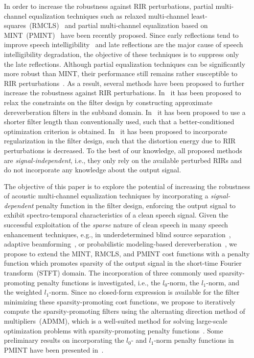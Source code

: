 \documentclass[10pt]{IEEEtran}
\begin{document}
In order to increase the robustness against RIR perturbations, partial multi-channel equalization techniques such as relaxed multi-channel least-squares~(RMCLS)~\cite{Lim_ITASLP_2014} and partial multi-channel equalization based on MINT~(PMINT)~\cite{Kodrasi_ITASLP_2013} have been recently proposed. 
Since early reflections tend to improve speech intelligibility~\cite{Arweiler_JASA_2011,Warzybok_JASA_2012} and late reflections are the major cause of speech intelligibility degradation, the objective of these techniques is to suppress only the late reflections.
Although partial equalization techniques can be significantly more robust than MINT, their performance still remains rather susceptible to RIR perturbations~\cite{Kodrasi_ITASLP_2013}.
As a result, several methods have been proposed to further increase the robustness against RIR perturbations.
In~\cite{Gaubitch_ITASLP_2009,Lim_EUSIPCO_2013} it has been proposed to relax the constraints on the filter design by constructing approximate dereverberation filters in the subband domain.
In~\cite{Kodrasi_EUSIPCO_2012} it has been proposed to use a shorter filter length than conventionally used, such that a better-conditioned optimization criterion is obtained.
In~\cite{Hikichi_EURASIP_2007,Kodrasi_ITASLP_2013} it has been proposed to incorporate regularization in the filter design, such that the distortion energy due to RIR perturbations is decreased.
To the best of our knowledge, all proposed methods are {\emph{signal-independent}}, i.e., they only rely on the available perturbed RIRs and do not incorporate any knowledge about the output signal. 

The objective of this paper is to explore the potential of increasing the robustness of acoustic multi-channel equalization techniques by incorporating a {\textit{signal-dependent}} penalty function in the filter design, enforcing the output signal to exhibit spectro-temporal characteristics of a clean speech signal. 
Given the successful exploitation of the {\textit{sparse}} nature of clean speech in many speech enhancement techniques, e.g., in underdetermined blind source separation~\cite{makino_2010,Arberet_ITASLP_2013}, adaptive beamforming~\cite{Kumatani_ITASLP_2009}, or probabilistic modeling-based dereverberation~\cite{vanwaterschoot13-122,Jukic_ITASLP_2015,Jukic_AES_2016}, we propose to extend the MINT, RMCLS, and PMINT cost functions with a penalty function which promotes sparsity of the output signal in the short-time Fourier transform~(STFT) domain.
The incorporation of three commonly used sparsity-promoting penalty functions is investigated, i.e., the $l_0$-norm, the $l_1$-norm, and the weighted $l_1$-norm.
Since no closed-form expression is available for the filter minimizing these sparsity-promoting cost functions, we propose to iteratively compute the sparsity-promoting filters using the alternating direction method of multipliers~(ADMM), which is a well-suited method for solving large-scale optimization problems with sparsity-promoting penalty functions~\cite{Boyd_admm_2011}. 
Some preliminary results on incorporating the $l_0$- and $l_1$-norm penalty functions in PMINT have been presented in~\cite{Kodrasi_ICASSP_2016}.
\end{document}
